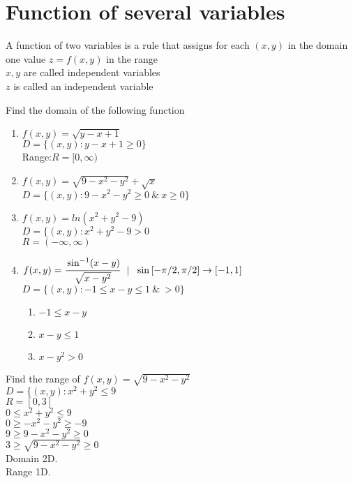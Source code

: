 \section{Function of several variables}
\begin{definition}
A function of two variables is a rule that assigns for each $(x,y)$ in the domain one value $z=f(x,y)$ in the range \\
$x,y$ are called independent variables\\
$z$ is called an independent variable
\end{definition} 
\begin{example}
Find the domain of the following function 
\begin{enumerate}
    \item $f(x,y)=\sqrt{y-x+1}$\\
    $D=\{(x,y):y-x+1\geq 0\}$\\
    Range:$R=[0,\infty)$
    \item $f(x,y)=\sqrt{9-x^2-y^2}+\sqrt{x}$\\
    $D=\{(x,y):9-x^2-y^2\geq 0~\&~x\geq0\}$
    \item $f(x,y)=ln(x^2+y^2-9)$\\
    $D=\{(x,y):x^2+y^2-9>0$\\
    $R=(-\infty,\infty)$
    \item $f(x,y)=\cfrac{\sin^{-1}(x-y)}{\sqrt{x-y^2}}~~|~~\sin{[-\pi/2,\pi/2]}\to [-1,1]$\\
    $D=\{(x,y):-1\leq x-y\leq 1 ~\&~>0\}$
    \begin{enumerate}
        \item $-1\leq x-y$
        \item $x-y\leq 1$
        \item $x-y^2>0$
    \end{enumerate}
\end{enumerate}
\end{example}
\begin{example}
Find the range of $f(x,y)=\sqrt{9-x^2-y^2}$\\
$D=\{(x,y):x^2+y^2\leq 9$\\
$R=[0,3]$\\
$0\leq x^2+y^2\leq 9$\\
$0\geq -x^2-y^2\geq -9$\\
$9\geq 9-x^2-y^2\geq 0$\\
$3\geq \sqrt{9-x^2-y^2}\geq 0$\\
Domain 2D.\\
Range 1D.
\end{example}
\noindent{\color{smalt(darkpowderblue)}\rule{\linewidth}{.2mm}}

